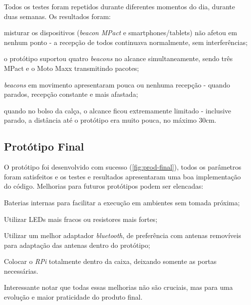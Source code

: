 Todos os testes foram repetidos durante diferentes momentos do dia, durante duas semanas. Os resultados foram:

\begin{alineas}
	\item misturar os dispositivos (\textit{beacon MPact} e smartphones/tablets) não afetou em nenhum ponto - a recepção de todos continuava normalmente, sem interferências;
	\item o protótipo suportou quatro \textit{beacons} no alcance simultaneamente, sendo três MPact e o Moto Maxx transmitindo pacotes;
	\item \textit{beacons} em movimento apresentaram pouca ou nenhuma recepção - quando parados, recepção constante e mais afastada;
	\item quando no bolso da calça, o alcance ficou extremamente limitado - inclusive parado, a distância até o protótipo era muito pouca, no máximo 30cm.
\end{alineas}

\subsection{Protótipo Final}\label{sec:prototipo-final}

O protótipo foi desenvolvido com sucesso (\autoref{fig:prod-final}), todos os parâmetros foram satisfeitos e os testes e resultados apresentaram uma boa implementação do código. Melhorias para futuros protótipos podem ser elencadas:

\begin{alineas}
	\item Baterias internas para facilitar a execução em ambientes sem tomada próxima;
	\item Utilizar LEDs mais fracos ou resistores mais fortes;
	\item Utilizar um melhor adaptador \textit{bluetooth}, de preferência com antenas removíveis para adaptação das antenas dentro do protótipo;
	\item Colocar o \textit{RPi} totalmente dentro da caixa, deixando somente as portas necessárias.
\end{alineas}

Interessante notar que todas essas melhorias não são cruciais, mas para uma evolução e maior praticidade do produto final.

